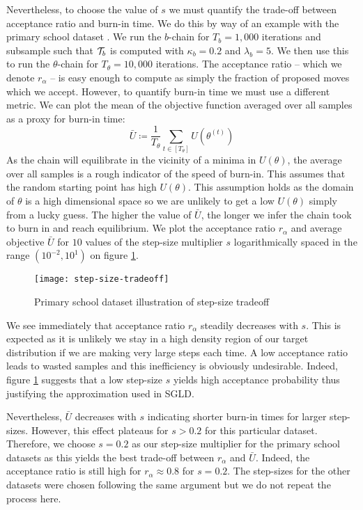 Nevertheless, to choose the value of $s$ we must quantify the trade-off between acceptance ratio and burn-in time. We do this by way of an example with the primary school dataset \cite{schools}. We run the $b$-chain for $T_b = 1,000$ iterations and subsample such that $\mathcal{T}_b$ is computed with $\kappa_b=0.2$ and $\lambda_b=5$. We then use this to run the $\theta$-chain for $T_\theta = 10,000$ iterations. The acceptance ratio -- which we denote $r_\alpha$ -- is easy enough to compute as simply the fraction of proposed moves which we accept. However, to quantify burn-in time we must use a different metric. We can plot the mean of the objective function averaged over all samples as a proxy for burn-in time:
%
\begin{equation}
	\bar{U} \coloneqq \frac{1}{T_\theta} \sum_{t \in [T_\theta]} U\left( \theta^{(t)} \right)
\end{equation}
%
As the chain will equilibrate in the vicinity of a minima in $U(\theta)$, the average over all samples is a rough indicator of the speed of burn-in. This assumes that the random starting point has high $U(\theta)$. This assumption holds as the domain of $\theta$ is a high dimensional space so we are unlikely to get a low $U(\theta)$ simply from a lucky guess. The higher the value of $\bar{U}$, the longer we infer the chain took to burn in and reach equilibrium. We plot the acceptance ratio $r_\alpha$ and average objective $\bar{U}$ for $10$ values of the step-size multiplier $s$ logarithmically spaced in the range $(10^{-2}, 10^1)$ on figure \ref{fig:step-size-tradeoff}.
%
\begin{figure}[!h]
	\centering
	\texttt{[image: step-size-tradeoff]}
	\caption{Primary school dataset \cite{schools} illustration of step-size tradeoff}
	\label{fig:step-size-tradeoff}
\end{figure}

We see immediately that acceptance ratio $r_\alpha$ steadily decreases with $s$. This is expected as it is unlikely we stay in a high density region of our target distribution if we are making very large steps each time. A low acceptance ratio leads to wasted samples and this inefficiency is obviously undesirable. Indeed, figure \ref{fig:step-size-tradeoff} suggests that a low step-size $s$ yields high acceptance probability thus justifying the approximation used in SGLD.

Nevertheless, $\bar{U}$ decreases with $s$ indicating shorter burn-in times for larger step-sizes. However, this effect plateaus for $s>0.2$ for this particular dataset. Therefore, we choose $s=0.2$ as our step-size multiplier for the primary school datasets as this yields the best trade-off between $r_\alpha$ and $\bar{U}$. Indeed, the acceptance ratio is still high for $r_\alpha \approx 0.8$ for $s=0.2$. The step-sizes for the other datasets were chosen following the same argument but we do not repeat the process here.

